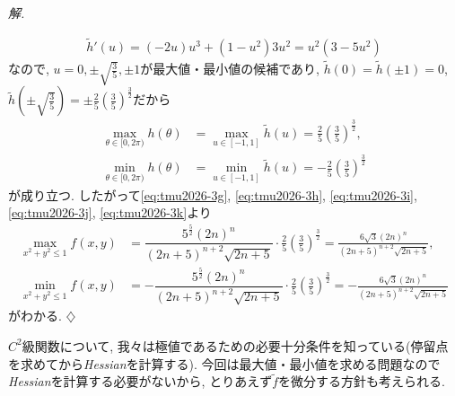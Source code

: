 \documentclass[titlepage]{jsarticle}
\numberwithin{equation}{section}
\newenvironment{kaitou}[1][解]{%
\begin{proofbox}%
\textit{#1. }\ignorespaces
}{%
\hfill$\diamondsuit$%
\end{proofbox}%
}
\begin{document}
\begin{kaitou}
\begin{align*}
\tilde{h}'(u) = (-2u)u^3 + (1-u^2)3u^2 = u^2(3 - 5u^2)
\end{align*}
なので, $u = 0, \pm\sqrt{\frac{3}{5}}, \pm 1$が最大値・最小値の候補であり, $\tilde{h}(0) = \tilde{h}(\pm1) = 0$, \,$\tilde{h}\left(\pm\sqrt{\frac{3}{5}}\right) = \pm\frac{2}{5}\left(\frac{3}{5}\right)^{\frac{3}{2}}$だから
\begin{align}
\max_{\theta \in [0, 2\pi)}h(\theta) &= \max_{u \in [-1, 1]}\tilde{h}(u) = \frac{2}{5}\left(\frac{3}{5}\right)^{\frac{3}{2}} \label{eq:tmu2026-3j},\\
\min_{\theta \in [0, 2\pi)}h(\theta) &= \min_{u \in [-1, 1]}\tilde{h}(u) = -\frac{2}{5}\left(\frac{3}{5}\right)^{\frac{3}{2}} \label{eq:tmu2026-3k}
\end{align}
が成り立つ. したがって\eqref{eq:tmu2026-3g}, \eqref{eq:tmu2026-3h}, \eqref{eq:tmu2026-3i}, \eqref{eq:tmu2026-3j}, \eqref{eq:tmu2026-3k}より
\begin{align*}
\max_{x^2 + y^2 \le 1}f(x, y)
&=
\dfrac{5^{\frac{5}{2}}(2n)^n}
{(2n + 5)^{n+2}\sqrt{2n + 5}}
\cdot \frac{2}{5}\left(\frac{3}{5}\right)^{\frac{3}{2}}
= \boxed{\frac{6\sqrt{3}(2n)^n}{(2n + 5)^{n + 2}\sqrt{2n+5}}},
\\
\min_{x^2 + y^2 \le 1}f(x, y)
&=
-\dfrac{5^{\frac{5}{2}}(2n)^n}
{(2n + 5)^{n+2}\sqrt{2n + 5}}
\cdot \frac{2}{5}\left(\frac{3}{5}\right)^{\frac{3}{2}}
=
\boxed{-\frac{6\sqrt{3}(2n)^n}{(2n + 5)^{n + 2}\sqrt{2n+5}}}
\end{align*}
がわかる.
\end{kaitou}
$C^2$級関数について, 我々は極値であるための必要十分条件を知っている(停留点を求めてから\textit{Hessian}を計算する). 今回は最大値・最小値を求める問題なので\textit{Hessian}を計算する必要がないから, とりあえず$\tilde{f}$を微分する方針も考えられる. 
\end{document}
